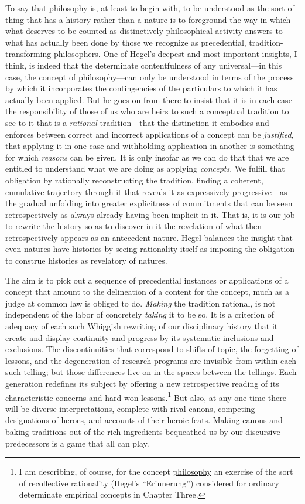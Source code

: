 To say that philosophy is, at least to begin with, to be understood as
the sort of thing that has a history rather than a nature is to
foreground the way in which what deserves to be counted as distinctively
philosophical activity answers to what has actually been done by those
we recognize as precedential, tradition-transforming philosophers. One
of Hegel's deepest and most important insights, I think, is indeed that
the determinate contentfulness of any universal---in this case, the
concept of philosophy---can only be understood in terms of the process
by which it incorporates the contingencies of the particulars to which
it has actually been applied. But he goes on from there to insist that
it is in each case the responsibility of those of us who are heirs to
such a conceptual tradition to see to it that is a \emph{rational}
tradition---that the distinction it embodies and enforces between
correct and incorrect applications of a concept can be \emph{justified},
that applying it in one case and withholding application in another is
something for which \emph{reasons} can be given. It is only insofar as
we can do that that we are entitled to understand what we are doing as
applying \emph{concepts}. We fulfill that obligation by rationally
reconstructing the tradition, finding a coherent, cumulative trajectory
through it that reveals it as expressively progressive---as the gradual
unfolding into greater explicitness of commitments that can be seen
retrospectively as always already having been implicit in it. That is,
it is our job to rewrite the history so as to discover in it the
revelation of what then retrospectively appears as an antecedent nature.
Hegel balances the insight that even natures have histories by seeing
rationality itself as imposing the obligation to construe histories as
revelatory of natures.

The aim is to pick out a sequence of precedential instances or
applications of a concept that amount to the delineation of a content
for the concept, much as a judge at common law is obliged to do.
\emph{Making} the tradition rational, is not independent of the labor of
concretely \emph{taking} it to be so. It is a criterion of adequacy of
each such Whiggish rewriting of our disciplinary history that it create
and display continuity and progress by its systematic inclusions and
exclusions. The discontinuities that correspond to shifts of topic, the
forgetting of lessons, and the degeneration of research programs are
invisible from within each such telling; but those differences live on
in the spaces between the tellings. Each generation redefines its
subject by offering a new retrospective reading of its characteristic
concerns and hard-won lessons.\footnote{I am describing, of course, for
  the concept \underline{philosophy} an exercise of the sort of
  recollective rationality (Hegel's ``Erinnerung'') considered for
  ordinary determinate empirical concepts in Chapter Three.} But also,
at any one time there will be diverse interpretations, complete with
rival canons, competing designations of heroes, and accounts of their
heroic feats. Making canons and baking traditions out of the rich
ingredients bequeathed us by our discursive predecessors is a game that
all can play.

